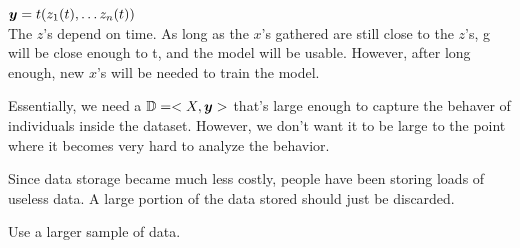 \documentclass[12pt]{article}
\begin{document}
\begin{enumerate}

$ \boldsymbol{y} = t ( z_1 (t), \dots z_n (t))$ \\

The $z$'s depend on time. As long as the $x$'s gathered are still close to the $z$'s, g will be close enough to t, and the model will be usable. However, after long enough, new $x$'s will be needed to train the model.  



Essentially, we need a $\mathbb{D} = < X, \boldsymbol{y} > $ that's large enough to capture the behaver of individuals inside the dataset. However, we don't want it to be large to the point where it becomes very hard to analyze the behavior.  

Since data storage became much less costly, people have been storing loads of useless data. A large portion of the data stored should just be discarded.  


Use a larger sample of data. 

\end{enumerate}


\end{document}
